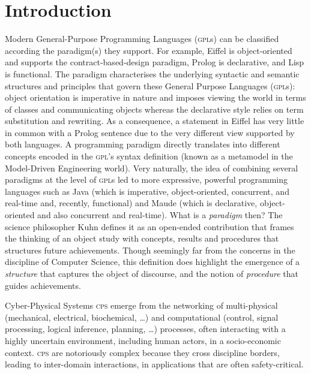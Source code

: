 \section{Introduction}
\label{sec:Introduction}

Modern General-Purpose Programming Languages (\textsc{gpl}s) can be
classified according the paradigm(s) they support.
For example, Eiffel is object-oriented and supports the contract-based-design
paradigm, Prolog is declarative, and Lisp is functional. The paradigm
characterises the underlying syntactic and semantic structures and principles
that govern these General Purpose Languages (\textsc{gpl}s): 
object orientation is imperative in nature and
imposes viewing the world in terms of classes and communicating objects whereas the
declarative style relies on term substitution and rewriting.
As a consequence, a statement in Eiffel has very little
in common with a Prolog sentence due to the very different view supported by
both languages.
A programming paradigm directly translates into different concepts encoded in
the \textsc{gpl}'s syntax definition (known as a metamodel in the
Model-Driven Engineering world).
Very naturally, the idea of combining several paradigms at the level of
\textsc{gpl}s led to more expressive, powerful programming languages such as
Java (which is imperative, object-oriented, concurrent, and real-time and,
recently, functional) and Maude (which is declarative, object-oriented and also
concurrent and real-time).
What is a \emph{paradigm} then? The science philosopher Kuhn \cite{B:Kuhn:2012}
defines it as an
open-ended contribution that frames the thinking of an object study with
concepts, results and procedures that structures future achievements. Though
seemingly far from the concerns in the discipline of Computer Science, this
definition does highlight the emergence of a \emph{structure} that
captures the object of discourse, and the notion of \emph{procedure} that guides
achievements.


Cyber-Physical Systems \textsc{cps} emerge from the networking of multi-physical  (mechanical, electrical, biochemical, \ldots) and computational (control, signal processing, logical inference, planning, \ldots) processes, often interacting with a highly uncertain environment, including human actors, in a socio-economic context.
\textsc{cps} are notoriously complex because they cross discipline borders,
leading to inter-domain interactions, in applications that are often
safety-critical.

